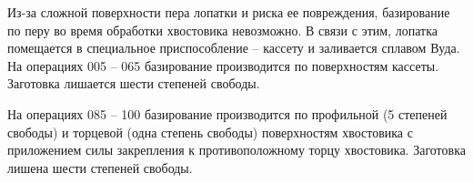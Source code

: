 Из-за сложной поверхности пера лопатки и риска ее повреждения, базирование по перу во время обработки хвостовика невозможно. В связи с этим, лопатка помещается в специальное приспособление – кассету и заливается сплавом Вуда. На операциях 005 – 065 базирование производится по поверхностям кассеты. Заготовка лишается шести степеней свободы.

На операциях 085 – 100 базирование производится по профильной (5 степеней свободы) и торцевой (одна степень свободы) поверхностям хвостовика с приложением силы закрепления к противоположному торцу хвостовика. Заготовка лишена шести степеней свободы.